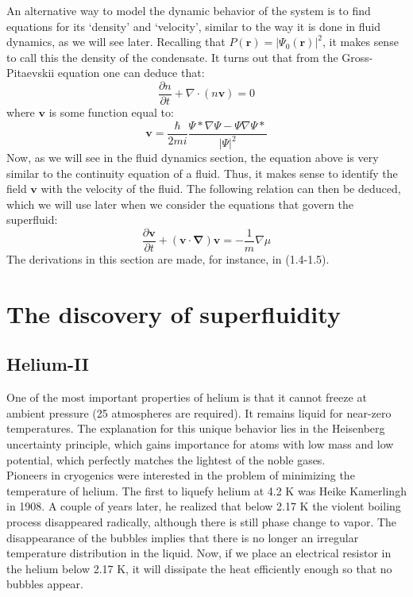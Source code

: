 \documentclass{article}
\begin{document}
An alternative way to model the dynamic behavior of the system is to find equations for its `density' and `velocity', similar to the way it is done in fluid dynamics, as we will see later.  Recalling that $P(\mathbf{r}) = |\Psi_0(\mathbf{r})|^2$, it makes sense to call this the density of the condensate.  It turns out that from the Gross-Pitaevskii equation one can deduce that:
\[\frac{\partial n}{\partial t} + \nabla \cdot (n \mathbf{v}) = 0\]
where $\mathbf{v}$ is some function equal to:
\[\mathbf{v} = \frac{\hbar}{2mi}\frac{\Psi*\nabla\Psi-\Psi\nabla\Psi*}{|\Psi|^2}\]
Now, as we will see in the fluid dynamics section, the equation above is very similar to the continuity equation of a fluid.  Thus, it makes sense to identify the field $\mathbf{v}$ with the velocity of the fluid.  The following relation can then be deduced, which we will use later when we consider the equations that govern the superfluid:
\begin{equation}\label{euler}
    \frac{\partial \mathbf{v}}{\partial t} + (\mathbf{v}\cdot \mathbf{\nabla})\mathbf{v} = -\frac{1}{m}\nabla \mu
\end{equation}
The derivations in this section are made, for instance, in \cite{JacquesTempere} (1.4-1.5).

\section{The discovery of superfluidity}

\subsection{Helium-II}
One of the most important properties of helium is that it cannot freeze at ambient pressure (25 atmospheres are required). It remains liquid for near-zero temperatures. The explanation for this unique behavior lies in the Heisenberg uncertainty principle, which gains importance for atoms with low mass and low potential, which perfectly matches the lightest of the noble gases.
\\

Pioneers in cryogenics were interested in the problem of minimizing the temperature of helium. The first to liquefy helium at 4.2 K was Heike Kamerlingh in 1908. A couple of years later, he realized that below 2.17 K the violent boiling process disappeared radically, although there is still phase change to vapor. The disappearance of the bubbles implies that there is no longer an irregular temperature distribution in the liquid. Now, if we place an electrical resistor in the helium below 2.17 K, it will dissipate the heat efficiently enough so that no bubbles appear. 
\\
\end{document}
